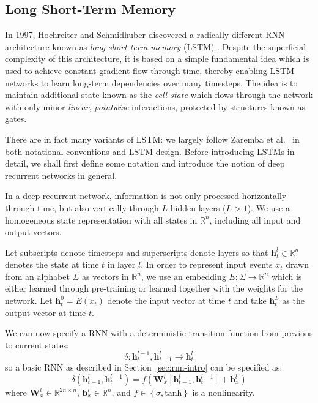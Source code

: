 \documentclass[12pt,a4paper,twoside,openright]{report}
\newcommand{\set}[1]{ \left\{ #1 \right\} }
\newcommand{\vect}[1]{\boldsymbol{\mathbf{#1}}}
\begin{document}
\subsection{Long Short-Term Memory}

In 1997, Hochreiter and Schmidhuber discovered a radically different RNN
architecture known as \emph{long short-term memory} (LSTM)
\cite{hochreiter1997long}. Despite the superficial complexity of this
architecture, it is based on a simple fundamental idea which is used to achieve
constant gradient flow through time, thereby enabling LSTM networks to learn
long-term dependencies over many timesteps. The idea is to maintain additional
state known as the \emph{cell state} which flows through the network with only
minor \emph{linear}, \emph{pointwise} interactions, protected by structures
known as gates. 

There are in fact many variants of LSTM: we largely follow Zaremba et al.\
\cite{zaremba2014recurrent} in both notational conventions and LSTM design.
Before introducing LSTMs in detail, we shall first define some notation and
introduce the notion of deep recurrent networks in general.

In a deep recurrent network, information is not only processed horizontally
through time, but also vertically through $L$ hidden layers ($L > 1$). We use a
homogeneous state representation with all states in $\mathbb{R}^n$, including
all input and output vectors. 

Let subscripts denote timesteps and superscripts denote layers so that
$\vect{h}_t^l \in \mathbb{R}^n$ denotes the state at time $t$ in layer $l$. In
order to represent input events $x_t$ drawn from an alphabet $\Sigma$ as vectors
in $\mathbb{R}^n$, we use an embedding $E : \Sigma \rightarrow \mathbb{R}^n$
which is either learned through pre-training or learned together with the
weights for the network. Let $\vect{h}_t^0 = E(x_t)$ denote the input vector at
time $t$ and take $\vect{h}_t^L$ as the output vector at time $t$.

We can now specify a RNN with a deterministic transition function from previous
to current states:
$$ \delta : \vect{h}_t^{l-1}, \vect{h}_{t-1}^l \rightarrow \vect{h}_t^l $$
so a basic RNN as described in Section~\ref{sec:rnn-intro} can be specified as:
$$ \delta(\vect{h}_{t-1}^l, \vect{h}_t^{l-1}) = f(\vect{W}^l_x [\vect{h}_{t-1}^l,
\vect{h}_t^{l-1}] + \vect{b}^l_x) $$
where $\vect{W}^l_x \in \mathbb{R}^{2n \times n}$, $\vect{b}^l_x \in
\mathbb{R}^n$, and $f \in \set{ \sigma, \mathrm{tanh} }$ is a nonlinearity.
\end{document}
